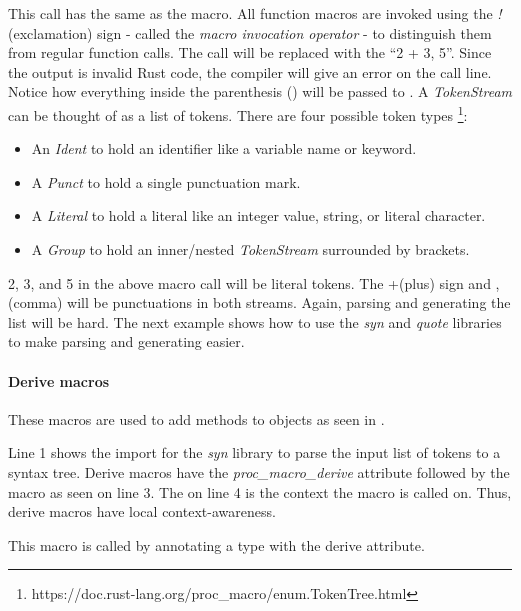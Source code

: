 This call has the same  as the macro.
All function macros are invoked using the \textit{!} (exclamation) sign - called the \textit{macro invocation operator} - to distinguish them from regular function calls.
The call will be replaced with the  ``2 + 3, 5''.
Since the output is invalid Rust code, the compiler will give an error on the call line.
Notice how everything inside the parenthesis () will be passed to .
A \textit{TokenStream} can be thought of as a list of tokens.
There are four possible token types \footnote{https://doc.rust-lang.org/proc\_macro/enum.TokenTree.html}:

\begin{itemize}
	\item An \textit{Ident} to hold an identifier like a variable name or keyword.
	\item A \textit{Punct} to hold a single punctuation mark.
	\item A \textit{Literal} to hold a literal like an integer value, string, or literal character.
	\item A \textit{Group} to hold an inner/nested \textit{TokenStream} surrounded by brackets.
\end{itemize}

2, 3, and 5 in the above macro call will be literal tokens.
The +(plus) sign and ,(comma) will be punctuations in both streams.
Again, parsing and generating the list will be hard.
The next example shows how to use the \textit{syn} and \textit{quote} libraries to make parsing and generating easier.

\paragraph{Derive macros}
These macros are used to add methods to objects as seen in .


Line 1 shows the import for the \textit{syn} library to parse the input list of tokens to a syntax tree.
Derive macros have the \textit{proc\_macro\_derive} attribute followed by the macro  as seen on line 3.
The  on line 4 is the context the macro is called on.
Thus, derive macros have local context-awareness.

This macro is called by annotating a type with the derive attribute.

